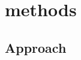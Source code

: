 \chapter{methods}
\label{chapter:Methods}
\graphicspath{{Chapter-3/graphics/}}

\section{Approach}


\newpage
